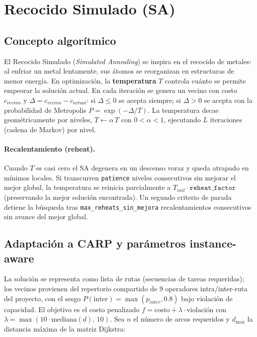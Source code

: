 \section{Recocido Simulado (SA)}
\label{sec:mh-sa}

\subsection{Concepto algorítmico}
El Recocido Simulado (\emph{Simulated Annealing}) se inspira en el recocido de
metales: al enfriar un metal lentamente, sus átomos se reorganizan en
estructuras de menor energía. En optimización, la \textbf{temperatura} $T$
controla cuánto se permite empeorar la solución actual. En cada iteración se
genera un vecino con costo $c_{vecino}$ y $\Delta = c_{vecino} - c_{actual}$:
si $\Delta \le 0$ se acepta siempre; si $\Delta > 0$ se acepta con la
probabilidad de Metropolis $P = \exp(-\Delta / T)$. La temperatura decae
geométricamente por niveles, $T \leftarrow \alpha\, T$ con $0 < \alpha < 1$,
ejecutando $L$ iteraciones (cadena de Markov) por nivel.

\paragraph{Recalentamiento (reheat).} Cuando $T$ es casi cero el SA degenera en
un descenso voraz y queda atrapado en mínimos locales. Si transcurren
\texttt{patience} niveles consecutivos sin mejorar el mejor global, la
temperatura se reinicia parcialmente a $T_{init} \cdot \texttt{reheat\_factor}$
(preservando la mejor solución encontrada). Un segundo criterio de parada
detiene la búsqueda tras \texttt{max\_reheats\_sin\_mejora} recalentamientos
consecutivos sin avance del mejor global.

\subsection{Adaptación a CARP y parámetros instance-aware}
La solución se representa como lista de rutas (secuencias de tareas
requeridas); los vecinos provienen del repertorio compartido de 9 operadores
intra/inter-ruta del proyecto, con el sesgo
$P(\text{inter}) = \max(p_{inter}, 0.8)$ bajo violación de capacidad. El
objetivo es el costo penalizado $f = \text{costo} + \lambda \cdot
\text{violación}$ con $\lambda = \max(10 \cdot \text{mediana}(d),\, 10)$.
Sea $n$ el número de arcos requeridos y $d_{\max}$ la distancia máxima de la
matriz Dijkstra:

